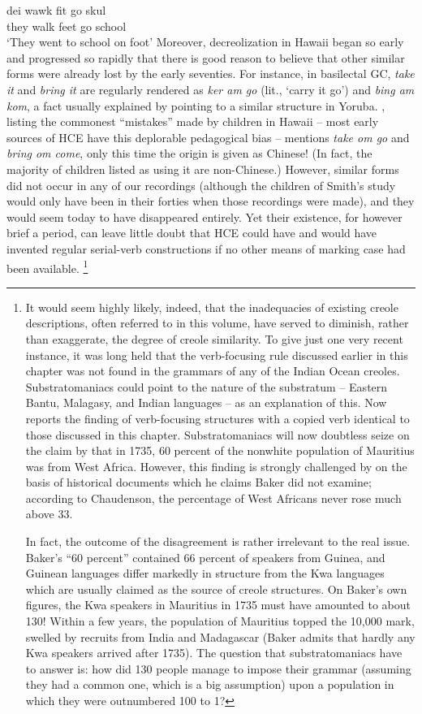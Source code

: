 \ea\label{ex:2:264}
\gll dei wawk fit go skul\\
they walk feet go school\\
\glt `They went to school on foot'
\z
Moreover, decreolization in Hawaii began so early and progressed so rapidly that there is good reason to believe that other similar forms were already lost by the early seventies. For instance, in basilectal GC, \textit{take it} and \textit{bring it} are regularly rendered as \textit{ker am go} (lit., `carry it go') and \textit{bing am kom}, a fact usually explained by pointing to a similar structure in Yoruba. \citet{Smith1939}, listing the commonest ``mistakes''
made by children in Hawaii -- most early sources of HCE have this deplorable pedagogical bias -- mentions \textit{take om go} and \textit{bring om come}, only this time the origin is given as Chinese! (In fact, the majority of children listed as using it are non-Chinese.) However, similar forms did not occur in any of our recordings (although the children of Smith's study would only have been in their forties when those recordings were made), and they would seem today to have disappeared entirely. Yet their existence, for however brief a period, can leave little doubt that HCE could have and would have invented regular serial-verb constructions if no other means of marking case had been available.
\footnote{It would seem highly likely, indeed, that the inadequacies of existing creole descriptions, often referred to in this volume, have served to diminish, rather than exaggerate, the degree of creole similarity. To give just one very recent instance, it was long held that the verb-focusing rule discussed earlier in this chapter was not found in the grammars of any of the Indian Ocean creoles. Substratomaniacs could point to the nature of the substratum -- Eastern Bantu, Malagasy, and Indian languages -- as an explanation of this. Now \citet{Corne1977} reports the finding of verb-focusing structures with a copied verb identical to those discussed in this chapter. Substratomaniacs will now doubtless seize on the claim by \citet{Baker1976} that in 1735, 60 percent of the nonwhite population of Mauritius was from West Africa. However, this finding is strongly challenged by \citet{Chaudenson1979} on the basis of historical documents which he claims Baker did not examine; according to Chaudenson, the percentage of West Africans never rose much above 33.
	
In fact, the outcome of the disagreement is rather irrelevant to the real issue. Baker's ``60 percent'' contained 66 percent of speakers from Guinea, and Guinean languages differ markedly in structure from the Kwa languages which are usually claimed as the source of creole structures. On Baker's own figures, the Kwa speakers in Mauritius in 1735 must have amounted to about 130! Within a few years, the population of Mauritius topped the 10,000 mark, swelled by recruits from India and Madagascar (Baker admits that hardly any Kwa speakers arrived after 1735). The question that substratomaniacs have to answer is: how did 130 people manage to impose their grammar (assuming they had a common one, which is a big assumption) upon a population in which they were outnumbered 100 to 1?}

